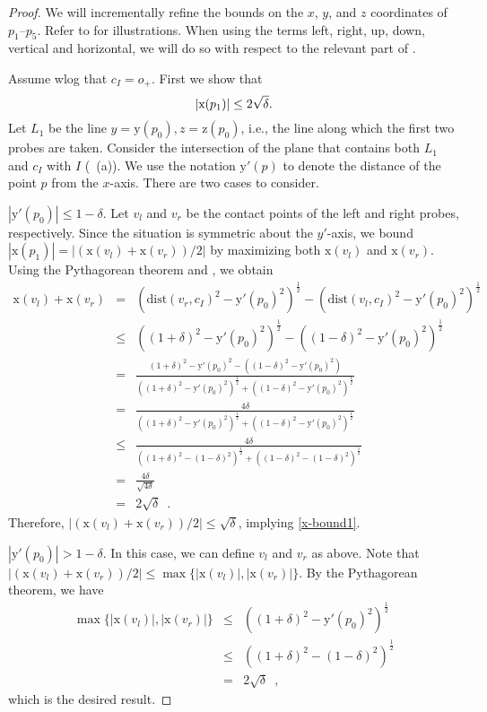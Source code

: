 \documentclass[11pt]{article}
\newcommand{\mysqrt}[1]{\left({#1}\right)^\frac{1}{2}}
\newcommand{\origin}{o_+}
\newcommand{\dist}{\mathrm{dist}}
\newcommand{\x}{\mathrm{x}}
\newcommand{\y}{\mathrm{y}}
\newcommand{\z}{\mathrm{z}}
\newcommand{\yp}{\mathrm{y'}}
\begin{document}
\begin{proof}
We will incrementally refine the bounds on the $x$, $y$, and $z$
coordinates of $p_1$--$p_5$.  Refer to  for
illustrations.  When using the terms left, right, up, down, vertical
and horizontal, we will do so with respect to the relevant part of
.

Assume wlog that $c_I=\origin$.  First we show that
\begin{equation}
|\x(p_1)|\le2\sqrt\delta.  \eqlabel{x-bound1}
\end{equation}
Let $L_1$ be the line $y=\y(p_0),z=\z(p_0)$, i.e., the line along which
the first two probes are taken.  Consider the intersection of the
plane that contains both $L_1$ and $c_I$ with $I$
(~(a)). We use the notation $\yp(p)$ to denote the
distance of the point $p$ from the $x$-axis.  There are two cases to
consider. 

 $|\yp(p_0)|\le 1-\delta$. Let $v_l$ and $v_r$
be the contact points of the left and right probes, respectively.
Since the situation is symmetric about the $y'$-axis, we bound
$|\x(p_1)|=|(\x(v_l)+\x(v_r))/2|$ by maximizing both $\x(v_l)$ and
$\x(v_r)$.  Using the Pythagorean theorem and , we obtain
\begin{eqnarray*}
\x(v_l)+\x(v_r)
  & = & \mysqrt{\dist(v_r,c_I)^2-\yp(p_0)^2} 
  	- \mysqrt{\dist(v_l,c_I)^2-\yp(p_0)^2} \\
& \le & \mysqrt{(1+\delta)^2-\yp(p_0)^2} 
        - \mysqrt{(1-\delta)^2-\yp(p_0)^2} \\
  & = & \frac{(1+\delta)^2-\yp(p_0)^2 - ((1-\delta)^2-\yp(p_0)^2)}
          {\mysqrt{(1+\delta)^2-\yp(p_0)^2} 
		+ \mysqrt{(1-\delta)^2-\yp(p_0)^2}} \\
  & = & \frac{4\delta}
          {\mysqrt{(1+\delta)^2-\yp(p_0)^2}
		+ \mysqrt{(1-\delta)^2-\yp(p_0)^2}} \\
  & \le & \frac{4\delta}
          {\mysqrt{(1+\delta)^2-(1-\delta)^2} 
		+ \mysqrt{(1-\delta)^2-(1-\delta)^2}}\\
  & = & \frac{4\delta}{\sqrt{4\delta}} \\ 
  & = & 2\sqrt{\delta}\enspace.
\end{eqnarray*}
Therefore, $|(\x(v_l)+\x(v_r))/2|\le\sqrt{\delta}$, implying
\eqref{x-bound1}.

 $|\yp(p_0)|>1-\delta$.  In this case, we can
define $v_l$ and $v_r$ as above.  Note that $|(\x(v_l)+\x(v_r))/2|\le
\max\{|\x(v_l)|,|\x(v_r)|\}$.  By the Pythagorean theorem, we have
\begin{eqnarray*}
\max\{|\x(v_l)|,|\x(v_r)|\}
  & \le & \mysqrt{(1+\delta)^2-\yp(p_0)^2} \\
  & \le & \mysqrt{(1+\delta)^2-(1-\delta)^2} \\
  & = & 2\sqrt{\delta} \enspace ,
\end{eqnarray*}
which is the desired result.


\end{proof}
\end{document}
